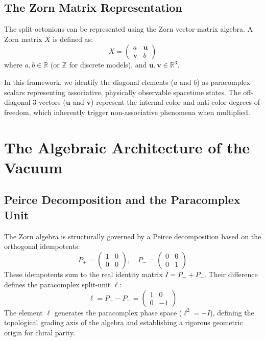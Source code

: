 \documentclass[11pt,a4paper]{article}
\begin{document}
\subsection{The Zorn Matrix Representation}
The split-octonions can be represented using the Zorn vector-matrix algebra. A Zorn matrix $X$ is defined as:
\begin{equation}
X = \begin{pmatrix} a & \mathbf{u} \\ \mathbf{v} & b \end{pmatrix}
\end{equation}
where $a, b \in \mathbb{R}$ (or $\mathbb{Z}$ for discrete models), and $\mathbf{u}, \mathbf{v} \in \mathbb{R}^3$. 

In this framework, we identify the diagonal elements ($a$ and $b$) as paracomplex scalars representing associative, physically observable spacetime states. The off-diagonal 3-vectors ($\mathbf{u}$ and $\mathbf{v}$) represent the internal color and anti-color degrees of freedom, which inherently trigger non-associative phenomena when multiplied.

\section{The Algebraic Architecture of the Vacuum}

\subsection{Peirce Decomposition and the Paracomplex Unit}
The Zorn algebra is structurally governed by a Peirce decomposition based on the orthogonal idempotents:
\begin{equation}
P_+ = \begin{pmatrix} 1 & 0 \\ 0 & 0 \end{pmatrix}, \quad P_- = \begin{pmatrix} 0 & 0 \\ 0 & 1 \end{pmatrix}
\end{equation}
These idempotents sum to the real identity matrix $I = P_+ + P_-$. Their difference defines the paracomplex split-unit $\ell$:
\begin{equation}
\ell = P_+ - P_- = \begin{pmatrix} 1 & 0 \\ 0 & -1 \end{pmatrix}
\end{equation}
The element $\ell$ generates the paracomplex phase space ($\ell^2 = +I$), defining the topological grading axis of the algebra and establishing a rigorous geometric origin for chiral parity.
\end{document}
